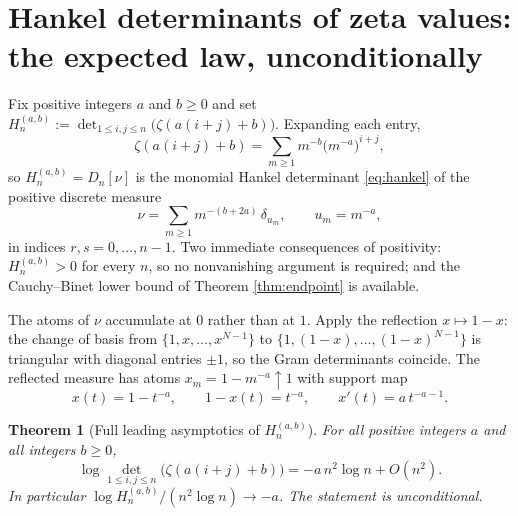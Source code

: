\documentclass[11pt]{amsart}
\numberwithin{equation}{section}
\theoremstyle{plain}
\newtheorem{theorem}{Theorem}[section]
\theoremstyle{definition}
\theoremstyle{remark}
\begin{document}
\section{Hankel determinants of zeta values: the expected law, unconditionally}
\label{sec:zeta}

Fix positive integers $a$ and $b\ge0$ and set
$H_{n}^{(a,b)}:=\det_{1\le i,j\le n}\bigl(\zeta(a(i+j)+b)\bigr)$. Expanding each entry,
\begin{equation}
\zeta(a(i+j)+b)=\sum_{m\ge1}m^{-b}\bigl(m^{-a}\bigr)^{i+j},
\end{equation}
so $H_{n}^{(a,b)}=D_{n}[\nu]$ is the monomial Hankel determinant \eqref{eq:hankel} of the positive
discrete measure
\begin{equation}
\nu=\sum_{m\ge1}m^{-(b+2a)}\,\delta_{u_{m}},\qquad u_{m}=m^{-a},
\label{eq:nu}
\end{equation}
in indices $r,s=0,\dots,n-1$. Two immediate consequences of positivity: $H_{n}^{(a,b)}>0$ for every
$n$, so no nonvanishing argument is required; and the Cauchy--Binet lower bound of Theorem
\ref{thm:endpoint} is available.

The atoms of $\nu$ accumulate at $0$ rather than at $1$. Apply the reflection $x\mapsto1-x$: the
change of basis from $\{1,x,\dots,x^{N-1}\}$ to $\{1,(1-x),\dots,(1-x)^{N-1}\}$ is triangular with
diagonal entries $\pm1$, so the Gram determinants coincide. The reflected measure has atoms
$x_{m}=1-m^{-a}\uparrow1$ with support map
\begin{equation}
x(t)=1-t^{-a},\qquad 1-x(t)=t^{-a},\qquad x'(t)=a\,t^{-a-1}.
\end{equation}

\begin{theorem}[Full leading asymptotics of $H_{n}^{(a,b)}$]
\label{thm:zeta}
For all positive integers $a$ and all integers $b\ge0$,
\begin{equation}
\boxed{\ \log\det_{1\le i,j\le n}\bigl(\zeta(a(i+j)+b)\bigr)=-a\,n^{2}\log n+O(n^{2}).\ }
\label{eq:zeta_law}
\end{equation}
In particular $\log H_{n}^{(a,b)}/(n^{2}\log n)\to-a$. The statement is unconditional.
\end{theorem}
\end{document}
